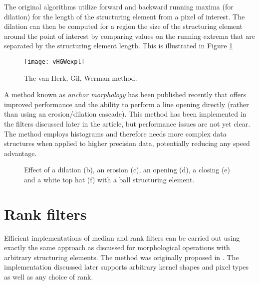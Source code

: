 \documentclass{InsightArticle}
\begin{document}
The original algorithms utilize forward and backward running maxima
(for dilation) for the length of the structuring element from a pixel
of interest. The dilation can then be computed for a region the size
of the structuring element around the point of interest by comparing
values on the running extrema that are separated by the structuring
element length. This is illustrated in Figure \ref{fig:vHGWmethod}

\begin{figure}[htbp]
\centering
\texttt{[image: vHGWexpl]}
\caption{The van Herk, Gil, Werman method.\label{fig:vHGWmethod}}
\end{figure}

A method known as {\em anchor morphology} has been published recently
\cite{Vandroogenbroeck2005Morphological} that offers improved
performance and the ability to perform a line opening directly (rather
than using an erosion/dilation cascade). This method has been
implemented in the filters discussed later in the article, but
performance issues are not yet clear. The method employs histograms
and therefore needs more complex data structures when applied to
higher precision data, potentially reducing any speed advantage.

\begin{figure}[htbp]
\begin{center}
\caption{Effect of a dilation (b), an erosion (c), an opening (d),
a closing (e) and a white top hat (f) with a ball structuring element.}
\end{center}
\end{figure}


\section{Rank filters}
\label{sect:rank}
Efficient implementations of median and rank filters can be carried out
using exactly the same approach as discussed for morphological
operations with arbitrary structuring elements. The method was
originally proposed in \cite{Huang79}. The implementation discussed
later supports arbitrary kernel shapes and pixel types as well as any
choice of rank.
\end{document}
